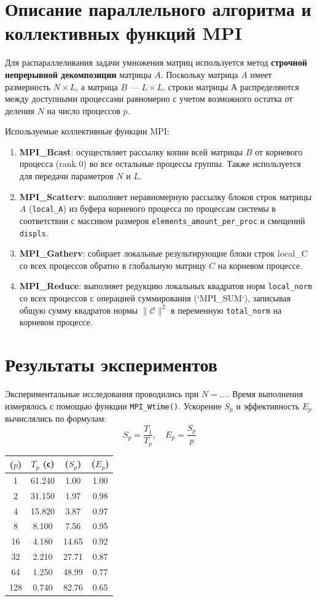 	\section{Описание параллельного алгоритма и коллективных функций MPI}
	Для распараллеливания задачи умножения матриц используется метод \textbf{строчной непрерывной декомпозиции} матрицы $A$. Поскольку матрица $A$ имеет размерность $N \times L$, а матрица $B$ — $L \times L$, строки матрицы $А$ распределяются между доступными процессами равномерно с учетом возможного остатка от деления $N$ на число процессов $p$.
	
	Используемые коллективные функции MPI:
	\begin{enumerate}
		\item \textbf{MPI\_Bcast}: осуществляет рассылку копии всей матрицы $B$ от корневого процесса (rank 0) во все остальные процессы группы. Также используется для передачи параметров $N$ и $L$.
		\item \textbf{MPI\_Scatterv}: выполняет неравномерную рассылку блоков строк матрицы $A$ (\texttt{local\_A}) из буфера корневого процесса по процессам системы в соответствии с массивом размеров \texttt{elements\_amount\_per\_proc} и смещений \texttt{displs}.
		\item \textbf{MPI\_Gatherv}: собирает локальные результирующие блоки строк local\_C со всех процессов обратно в глобальную матрицу $C$ на корневом процессе.
		\item \textbf{MPI\_Reduce}: выполняет редукцию локальных квадратов норм \texttt{local\_norm} со всех процессов с операцией суммирования (`MPI\_SUM`), записывая общую сумму квадратов нормы $\|\mathcal{C}\|^2$ в переменную \texttt{total\_norm} на корневом процессе.
	\end{enumerate}
	
	\section{Результаты экспериментов}
	
	Экспериментальные исследования проводились при $N = \dots$. Время выполнения измерялось с помощью функции \texttt{MPI\_Wtime()}. Ускорение $S_p$ и эффективность $E_p$ вычислялись по формулам:
	\[ S_p = \frac{T_1}{T_p}, \quad E_p = \frac{S_p}{p} \]
	
	
	\begin{center}
		\begin{tabular}{c|c|c|c}
			\toprule
			($p$) & $T_p$ (с) & ($S_p$) & ($E_p$) \\
			\midrule
			1   & 61.240 & 1.00  & 1.00 \\
			2   & 31.150 & 1.97  & 0.98 \\
			4   & 15.820 & 3.87  & 0.97 \\
			8   & 8.100  & 7.56  & 0.95 \\
			16  & 4.180  & 14.65 & 0.92 \\
			32  & 2.210  & 27.71 & 0.87 \\
			64  & 1.250  & 48.99 & 0.77 \\
			128 & 0.740  & 82.76 & 0.65 \\
			\bottomrule
		\end{tabular}
	\end{center}
	
